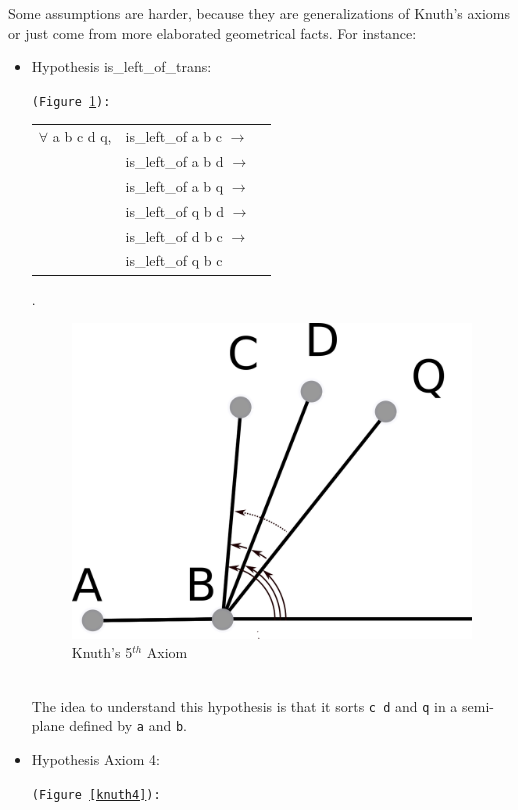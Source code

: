 \documentclass[a4paper,10pt]{article}
\def\hypothesis#1#2{{\color{purple}Hypothesis} {\color{blue}#1}: {\tt #2}}
\begin{document}
Some assumptions are harder, because they are generalizations of Knuth's axioms or just come from more elaborated geometrical facts. For instance:
\begin{itemize}
\item \hypothesis{is\_left\_of\_trans}{(Figure \ref{knuth5}):\\  \begin{tabular}{lll}
                                          $\forall$ a b c d q, &is\_left\_of a b c $\rightarrow$\\
                                           &is\_left\_of a b d $\rightarrow$\\
                                           &is\_left\_of a b q $\rightarrow$\\
                                           &is\_left\_of q b d $\rightarrow$\\
                                           &is\_left\_of d b c $\rightarrow$\\
                                           &is\_left\_of q b c 
           \end{tabular} }.
\\
\begin{figure}
\centering
\includegraphics[scale=2]{Axiom5}
\caption{\label{knuth5} Knuth's 5$^{th}$ Axiom}
\end{figure}\\
The idea to understand this hypothesis is that it sorts {\tt c d} and {\tt q} in a semi-plane defined by {\tt a} and {\tt b}.
\item \hypothesis{Axiom 4}{(Figure \ref{knuth4}):\\ \begin{tabular}{ll}

\end{tabular}}
\end{itemize}
\end{document}
